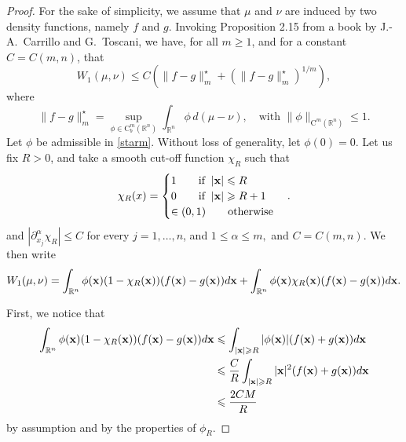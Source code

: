 \documentclass{article}
\renewcommand{\leq}{\leqslant}
\renewcommand{\geq}{\geqslant}
\renewcommand{\le}{\leqslant}
\renewcommand{\ge}{\geqslant}
\def\bx{{\bf x}}
\def \erre{\mathbb{R}}
\newtheorem{proof}{Proof}
\begin{document}
\begin{proof}
For the sake of simplicity, we assume that $\mu$ and $\nu$ are induced by two density functions, namely $f$ and $g$.
Invoking Proposition 2.15 from a book by J.-A.~Carrillo and G.~Toscani\cite{CaTo}, we have, for all $m \geq 1$, and for a constant $C=C(m,n)$, that
\begin{equation}
\label{eq:CaTo}
W_1(\mu,\nu) \leq C (\|f-g\|^\star_m + (\|f-g\|^\star_m)^{1/m}),
\end{equation}
where 
\begin{equation}\label{starm}
\|f-g\|^\star_m = \sup_{\phi \in \mathrm{C}_b^m(\erre^n)} \int_{\erre^n} \phi \, d(\mu-\nu), \quad \text{with} \,\, \|\phi\|_{\mathrm{C}^m(\erre^n)} \leq 1.
\end{equation}
Let $\phi$ be admissible in \eqref{starm}. Without loss of generality, let $\phi(0)=0.$ 
Let us fix $R>0$, and take a smooth cut-off function $\chi_R$ such that 
\begin{equation}
    \chi_R(x)=\begin{cases}
        1\quad\quad\text{if}\;\;|\bx|\le R\\
        0\quad\quad\text{if}\;\;|\bx|\ge R+1\\
        \in(0,1)\quad\quad\text{otherwise}
    \end{cases}.
\end{equation}
% 
and $|\partial^\alpha_{x_j}\chi_R|\le C$ for every $j=1,\dots,n$, and $1\leq \alpha \leq m,$ and $C=C(m,n)$.
% 
We then write
\begin{equation}
    \label{eq:potential_split}
    W_1(\mu,\nu)=\int_{\erre^n}\phi(\bx)(1-\chi_R(\bx))(f(\bx)-g(\bx))d\bx+\int_{\erre^n}\phi(\bx)\chi_R(\bx)(f(\bx)-g(\bx))d\bx.
\end{equation}



First, we notice that
\begin{align}
\nonumber\int_{\erre^n}\phi(\bx)(1-\chi_R(\bx))(f(\bx)-g(\bx))d\bx&\le \int_{|\bx|\ge R}|\phi(\bx)|(f(\bx)+g(\bx))d\bx\\
    &\le \frac{C}{R}\int_{|\bx|\ge R}|\bx|^2(f(\bx)+g(\bx))d\bx\\
    \nonumber&\le \frac{2CM}{R}
\end{align}
by assumption and by the properties of $\phi_R$.
% 


\end{proof}
\end{document}
